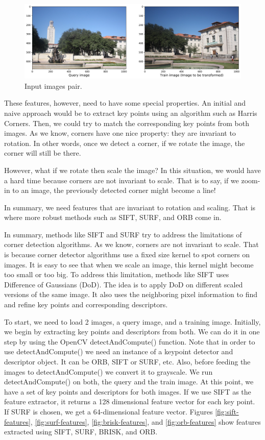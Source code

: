 \documentclass[10pt,twocolumn,letterpaper]{article}
\begin{document}
\begin{figure}[h!]
\begin{center}
	\includegraphics[width=0.99\columnwidth]{pics/input_img_1.jpeg}
	\caption{Input images pair. \label{fig:input-images}}   
\end{center} 
\end{figure}  

These features, however, need to have some special properties. An initial and naive approach would be to extract key points using an algorithm such as Harris Corners. Then, we could try to match the corresponding key points from both images. As we know, corners have one nice property: they are invariant to rotation. In other words, once we detect a corner, if we rotate the image, the corner will still be there.

However, what if we rotate then scale the image? In this situation, we would have a hard time because corners are not invariant to scale. That is to say, if we zoom-in to an image, the previously detected corner might become a line!

In summary, we need features that are invariant to rotation and scaling. That is where more robust methods such as SIFT, SURF, and ORB come in.

In summary, methods like SIFT and SURF try to address the limitations of corner detection algorithms. As we know, corners are not invariant to scale. That is because corner detector algorithms use a fixed size kernel to spot corners on images. It is easy to see that when we scale an image, this kernel might become too small or too big.
To address this limitation, methods like SIFT uses Difference of Gaussians (DoD). The idea is to apply DoD on different scaled versions of the same image. It also uses the neighboring pixel information to find and refine key points and corresponding descriptors.

To start, we need to load 2 images, a query image, and a training image. Initially, we begin by extracting key points and descriptors from both. We can do it in one step by using the OpenCV detectAndCompute() function. Note that in order to use detectAndCompute() we need an instance of a keypoint detector and descriptor object. It can be ORB, SIFT or SURF, etc. Also, before feeding the images to detectAndCompute() we convert it to grayscale.
We run detectAndCompute() on both, the query and the train image. At this point, we have a set of key points and descriptors for both images. If we use SIFT as the feature extractor, it returns a 128 dimensional feature vector for each key point. If SURF is chosen, we get a 64-dimensional feature vector. Figures \ref{fig:sift-features}, \ref{fig:surf-features}, \ref{fig:brisk-features}, and \ref{fig:orb-features} show features extracted using SIFT, SURF, BRISK, and ORB.
\end{document}
